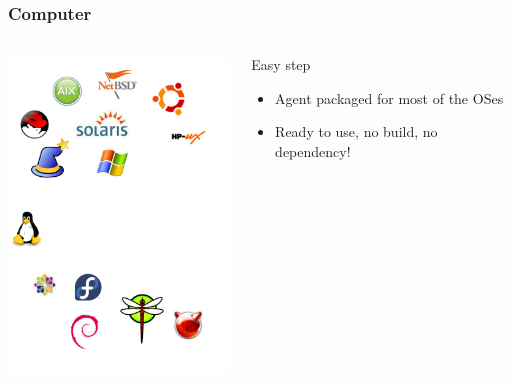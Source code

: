 \documentclass{beamer}
\begin{document}
\begin{frame}

    \frametitle{Computer}
 \begin{columns}
 \begin{column}{0.15\textwidth}
         \includegraphics[height=8.5cm]{./pics/os.pdf}
 \end{column}
 \begin{column}{1.25\textwidth}
    \begin{block}{Easy step}
        \begin{itemize}
            \item Agent packaged for most of the OSes
            \item Ready to use, no build, no dependency!
        \end{itemize}
    \end{block}


 \end{column}
\end{columns}




\end{frame}
\end{document}
